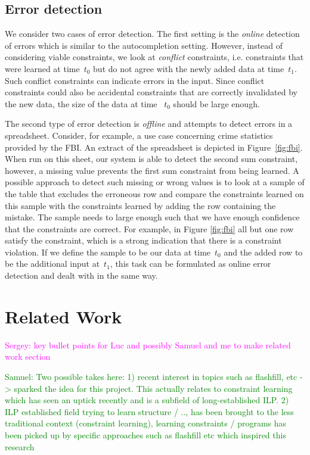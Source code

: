 \documentclass{sig-alternate-05-2015}
\newcommand{\sergey}[1]{\textcolor{magenta}{{\sc Sergey:} #1}\xspace}
\newcommand{\samuel}[1]{\textcolor{green}{{\sc Samuel:} #1}\xspace}
\begin{document}
\subsection{Error detection}
We consider two cases of error detection.
The first setting is the \textit{online} detection of errors which is similar to the autocompletion setting.
However, instead of considering viable constraints, we look at \textit{conflict} constraints, i.e. constraints that were learned at time~$t_0$ but do not agree with the newly added data at time~$t_1$.
Such conflict constraints can indicate errors in the input.
Since conflict constraints could also be accidental constraints that are correctly invalidated by the new data, the size of the data at time ~$t_0$ should be large enough.

The second type of error detection is \textit{offline} and attempts to detect errors in a spreadsheet.
Consider, for example, a use case concerning crime statistics provided by the FBI.
An extract of the spreadsheet is depicted in Figure~\ref{fig:fbi}.
When run on this sheet, our system is able to detect the second sum constraint, however, a missing value prevents the first sum constraint from being learned.
A possible approach to detect such missing or wrong values is to look at a sample of the table that excludes the erroneous row and compare the constraints learned on this sample with the constraints learned by adding the row containing the mistake.
The sample needs to large enough such that we have enough confidence that the constraints are correct. For example, in Figure \ref{fig:fbi} all but one row satisfy the constraint, which is a strong indication that there is a constraint violation.
If we define the sample to be our data at time~$t_0$ and the added row to be the additional input at~$t_1$, this task can be formulated as online error detection and dealt with in the same way.

\section{Related Work}\label{sec:related_work}
\sergey{key bullet points for Luc and possibly Samuel and me to make related work section}

\samuel{Two possible takes here: 1) recent interest in topics such as flashfill, etc -> sparked the idea for this project. This actually relates to constraint learning which has seen an uptick recently and is a subfield of long-established ILP. 2) ILP established field trying to learn structure / .., has been brought to the less traditional context (constraint learning), learning constraints / programs has been picked up by specific approaches such as flashfill etc which inspired this research}
\end{document}
